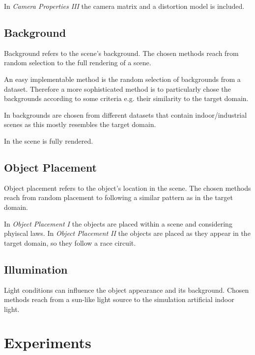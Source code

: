 In \textit{Camera Properties III} the camera matrix and a distortion model is included.


\subsection{Background} 

Background refers to the scene's background. The chosen methods reach from random selection to the full rendering of a scene.

An easy implementable method is the random selection of backgrounds from a dataset. 
Therefore a more sophisticated method is to particularly chose the backgrounds according to some criteria e.g. their similarity to the target domain. 

In  backgrounds are chosen from different datasets  that contain indoor/industrial scenes as this mostly resembles the target domain. 

In  the scene is fully rendered.


\subsection{Object Placement} 

Object placement refers to the object's location in the scene. The chosen methods reach from random placement to following a similar pattern as in the target domain.

In \textit{Object Placement I} the objects are placed within a scene and considering phyiscal laws. In \textit{Object Placement II} the objects are placed as they appear in the target domain, so they follow a race circuit.

\subsection{Illumination}

Light conditions can influence the object appearance and its background. Chosen methods reach from a sun-like light source to the simulation artificial indoor light.

\section{Experiments}
\label{sec:training:experiments}


